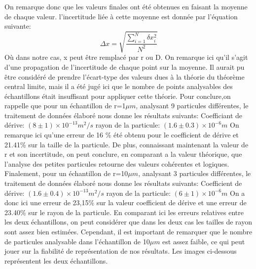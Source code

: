 \documentclass[11pt,letterpaper]{article}
\begin{document}
On remarque donc que les valeurs finales ont été obtenues en faisant la moyenne de chaque valeur. l'incertitude liée à cette moyenne est donnée
par l'équation suivante: 
\[
  \Delta x = \sqrt{\frac{\sum_{i=1}^N \delta x_{i}^2}{N^2}}
\]
Où dans notre cas, x peut être remplacé par r ou D. On remarque ici qu'il s'agit d'une propagation de l’incertitude de chaque point sur la 
moyenne. Il aurait pu être considéré de prendre l'écart-type des valeurs dues à la théorie du théorème central limite, mais il a été jugé ici que le nombre de points 
analysables des échantillons était insuffisant pour appliquer cette théorie. 
Pour conclure,on rappelle que pour un échantillon de r=1$\mu m$, analysant 9 particules différentes, 
le traitement de données élaboré nous donne les résultats suivants: 
Coefficiant de dérive: $(8 \pm 1) \times 10^{-13} m^{2}/s$
rayon de la particule: $(1.6 \pm 0.3)\times 10^{-6} m$
On remarque ici qu'une erreur de 16 \% été obtenu pour le coefficient de dérive et 21.41\% sur la taille de la particule.
De plus, connaissant maintenant la valeur de r et son incertitude, on peut conclure, en comparant a la valeur théorique, que l'analyse 
des petites particules retourne des valeurs cohérentes et logiques. 
Finalement, pour un échantillon de r=10$\mu m$, analysant 3 particules différentes, 
le traitement de données élaboré nous donne les résultats suivants: 
Coefficient de dérive: $(1.6 \pm 0.4) \times 10^{-13} m^{2}/s$
rayon de la particule: $(6 \pm 1)\times 10^{-6} m$
On a donc ici une erreur de 23,15\% sur la valeur coefficient de dérive et une erreur de 23.40\% sur le rayon de la particule. 
En comparant ici les erreurs relatives entre les deux échantillons, on peut considérer que dans les deux cas les tailles de rayon sont assez bien estimées. Cependant, il est important de remarquer que le nombre de particules analysable dans l'échantillon de 10$\mu m$ est assez faible, ce qui 
peut jouer sur la fiabilité de représentation de nos résultats. Les images ci-dessous représentent les deux échantillons. 
\end{document}
